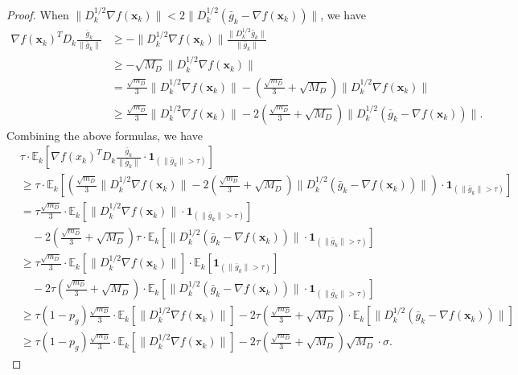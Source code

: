\documentclass[10pt,a4paper]{amsart}
\newcommand{\barg}{\bar{g}}
\newcommand{\bx}{\boldsymbol{x}}
\begin{document}
\begin{proof}
When $\|D_k^{1/2}\nabla f(\bx_k)\|<2\|D_k^{1/2}(\barg_k-\nabla f(\bx_k))\|$, we have
\begin{align*}
    \nabla f(\bx_k)^TD_k\frac{\barg_k}{\|\barg_k\|} & \geq - \| D_k^{1/2}\nabla f(\bx_k)\| \frac{\| D_k^{1/2}\barg_k\|}{\|\barg_k\|}\\
   & \geq - \sqrt{M_D}\| D_k^{1/2}\nabla f(\bx_k)\|\\
   & =  \frac{\sqrt{m_D}}{3}\| D_k^{1/2}\nabla f(\bx_k)\| - \left( \frac{\sqrt{m_D}}{3} + \sqrt{M_D}\right)\| D_k^{1/2}\nabla f(\bx_k)\| \\
   & \geq \frac{\sqrt{m_D}}{3}\| D_k^{1/2}\nabla f(\bx_k)\| - 2\left( \frac{\sqrt{m_D}}{3} + \sqrt{M_D}\right)\| D_k^{1/2}(\barg_k-\nabla f(\bx_k))\|.
\end{align*}
Combining the above formulas, we have
\begin{align*}
   & \tau \cdot \mathbb{E}_k\left[\nabla f(x_k)^T D_k \frac{\bar{g}_k}{\|\bar{g}_k\|} \cdot \boldsymbol{1}_{(\|\bar{g}_k\| > \tau)} \right] \\
   & \geq  
   \tau \cdot \mathbb{E}_k\left[\left(\frac{\sqrt{m_D}}{3}\| D_k^{1/2}\nabla f(\bx_k)\| - 2\left( \frac{\sqrt{m_D}}{3} + \sqrt{M_D}\right)\| D_k^{1/2}(\barg_k-\nabla f(\bx_k))\|\right) \cdot \boldsymbol{1}_{(\|\bar{g}_k\| > \tau)} \right] \\
   & = \tau \frac{\sqrt{m_D}}{3} \cdot \mathbb{E}_k\left[\| D_k^{1/2}\nabla f(\bx_k)\| \cdot \boldsymbol{1}_{(\|\bar{g}_k\| > \tau)} \right]  \\
   & \quad - 2\left( \frac{\sqrt{m_D}}{3} + \sqrt{M_D}\right) \tau \cdot \mathbb{E}_k\left[ \| D_k^{1/2}(\barg_k-\nabla f(\bx_k))\|\cdot \boldsymbol{1}_{(\|\bar{g}_k\| > \tau) } \right] \\
   & \geq \tau \frac{\sqrt{m_D}}{3} \cdot \mathbb{E}_k\left[\| D_k^{1/2}\nabla f(\bx_k)\|\right] \cdot \mathbb{E}_k\left[\boldsymbol{1}_{(\|\bar{g}_k\| > \tau) }\right]  \\
   & \quad - 2\tau \left( \frac{\sqrt{m_D}}{3} + \sqrt{M_D}\right)  \cdot \mathbb{E}_k\left[ \| D_k^{1/2}(\barg_k-\nabla f(\bx_k))\|\cdot \boldsymbol{1}_{(\|\bar{g}_k\| > \tau)} \right] \\
   & \geq \tau (1-p_g) \frac{\sqrt{m_D}}{3} \cdot \mathbb{E}_k\left[\| D_k^{1/2}\nabla f(\bx_k)\|\right]  - 2\tau \left( \frac{\sqrt{m_D}}{3} + \sqrt{M_D}\right)  \cdot \mathbb{E}_k\left[ \| D_k^{1/2}(\barg_k-\nabla f(\bx_k))\|  \right] \\
   & \geq \tau (1-p_g) \frac{\sqrt{m_D}}{3} \cdot \mathbb{E}_k\left[\| D_k^{1/2}\nabla f(\bx_k)\|\right]  - 2\tau \left( \frac{\sqrt{m_D}}{3} + \sqrt{M_D}\right) \sqrt{M_D} \cdot \sigma .
\end{align*}


\end{proof}
\end{document}
